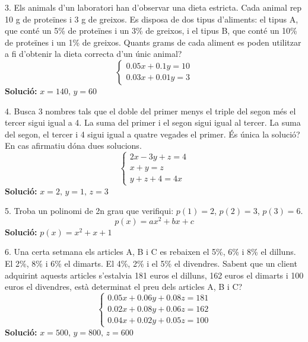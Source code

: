 \documentclass[12pt]{article}
\begin{document}
\begin{exercici}
3. Els animals d’un laboratori han d’observar una dieta estricta. Cada animal rep 10 g de proteïnes i 3 g de greixos. Es disposa de dos tipus d’aliments: el tipus A, que conté un 5\% de proteïnes i un 3\% de greixos, i el tipus B, que conté un 10\% de proteïnes i un 1\% de greixos. Quants grams de cada aliment es poden utilitzar a fi d’obtenir la dieta correcta d’un únic animal?
\[
\begin{cases}
0.05x + 0.1y = 10 \\
0.03x + 0.01y = 3
\end{cases}
\]
\textbf{Solució:} \( x = 140, \, y = 60 \)
\end{exercici}

\begin{exercici}
4. Busca 3 nombres tals que el doble del primer menys el triple del segon més el tercer sigui igual a 4. La suma del primer i el segon sigui igual al tercer. La suma del segon, el tercer i 4 sigui igual a quatre vegades el primer. És única la solució? En cas afirmatiu dóna dues solucions.
\[
\begin{cases}
2x - 3y + z = 4 \\
x + y = z \\
y + z + 4 = 4x
\end{cases}
\]
\textbf{Solució:} \( x = 2, \, y = 1, \, z = 3 \)
\end{exercici}

\begin{exercici}
5. Troba un polinomi de 2n grau que verifiqui: \(p(1) = 2\), \(p(2) = 3\), \(p(3) = 6\).
\[
p(x) = ax^2 + bx + c
\]
\textbf{Solució:} \( p(x) = x^2 + x + 1 \)
\end{exercici}

\begin{exercici}
6. Una certa setmana els articles A, B i C es rebaixen el 5\%, 6\% i 8\% el dilluns. El 2\%, 8\% i 6\% el dimarts. El 4\%, 2\% i el 5\% el divendres. Sabent que un client adquirint aquests articles s’estalvia 181 euros el dilluns, 162 euros el dimarts i 100 euros el divendres, està determinat el preu dels articles A, B i C?
\[
\begin{cases}
0.05x + 0.06y + 0.08z = 181 \\
0.02x + 0.08y + 0.06z = 162 \\
0.04x + 0.02y + 0.05z = 100
\end{cases}
\]
\textbf{Solució:} \( x = 500, \, y = 800, \, z = 600 \)
\end{exercici}
\end{document}
